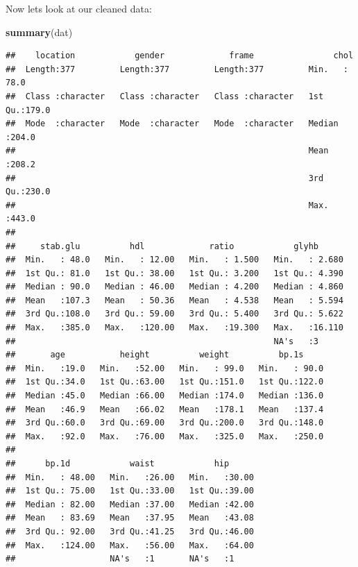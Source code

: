 \documentclass[
]{book}
\newenvironment{Shaded}{\begin{snugshade}}{\end{snugshade}}
\newcommand{\FunctionTok}[1]{\textcolor[rgb]{0.13,0.29,0.53}{\textbf{#1}}}
\newcommand{\NormalTok}[1]{#1}
\begin{document}
Now lets look at our cleaned data:

\begin{Shaded}
\begin{Highlighting}[]
\FunctionTok{summary}\NormalTok{(dat)}
\end{Highlighting}
\end{Shaded}

\begin{verbatim}
##    location            gender             frame                chol      
##  Length:377         Length:377         Length:377         Min.   : 78.0  
##  Class :character   Class :character   Class :character   1st Qu.:179.0  
##  Mode  :character   Mode  :character   Mode  :character   Median :204.0  
##                                                           Mean   :208.2  
##                                                           3rd Qu.:230.0  
##                                                           Max.   :443.0  
##                                                                          
##     stab.glu          hdl             ratio            glyhb       
##  Min.   : 48.0   Min.   : 12.00   Min.   : 1.500   Min.   : 2.680  
##  1st Qu.: 81.0   1st Qu.: 38.00   1st Qu.: 3.200   1st Qu.: 4.390  
##  Median : 90.0   Median : 46.00   Median : 4.200   Median : 4.860  
##  Mean   :107.3   Mean   : 50.36   Mean   : 4.538   Mean   : 5.594  
##  3rd Qu.:108.0   3rd Qu.: 59.00   3rd Qu.: 5.400   3rd Qu.: 5.622  
##  Max.   :385.0   Max.   :120.00   Max.   :19.300   Max.   :16.110  
##                                                    NA's   :3       
##       age           height          weight          bp.1s      
##  Min.   :19.0   Min.   :52.00   Min.   : 99.0   Min.   : 90.0  
##  1st Qu.:34.0   1st Qu.:63.00   1st Qu.:151.0   1st Qu.:122.0  
##  Median :45.0   Median :66.00   Median :174.0   Median :136.0  
##  Mean   :46.9   Mean   :66.02   Mean   :178.1   Mean   :137.4  
##  3rd Qu.:60.0   3rd Qu.:69.00   3rd Qu.:200.0   3rd Qu.:148.0  
##  Max.   :92.0   Max.   :76.00   Max.   :325.0   Max.   :250.0  
##                                                                
##      bp.1d            waist            hip       
##  Min.   : 48.00   Min.   :26.00   Min.   :30.00  
##  1st Qu.: 75.00   1st Qu.:33.00   1st Qu.:39.00  
##  Median : 82.00   Median :37.00   Median :42.00  
##  Mean   : 83.69   Mean   :37.95   Mean   :43.08  
##  3rd Qu.: 92.00   3rd Qu.:41.25   3rd Qu.:46.00  
##  Max.   :124.00   Max.   :56.00   Max.   :64.00  
##                   NA's   :1       NA's   :1
\end{verbatim}
\end{document}
